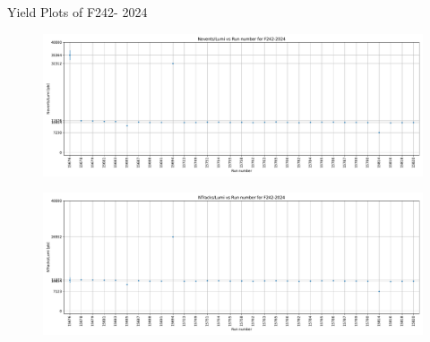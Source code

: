 \begin{frame}{Yield Plots of F242- 2024}
    \begin{figure}
        \centering
        \includegraphics[width=1.0\textwidth]{plots_runwise/NEventsbyLumi_2024_F242.pdf}
    \end{figure}
    \vspace{-0.35cm}
    \begin{figure}
        \centering
        \includegraphics[width=1.0\textwidth]{plots_runwise/NTracksbyLumi_2024_F242.pdf}
    \end{figure}
\end{frame}

